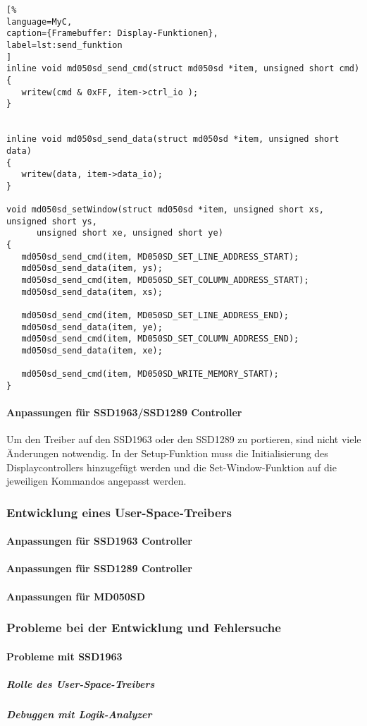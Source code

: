 \begin{lstlisting}[%
language=MyC,
caption={Framebuffer: Display-Funktionen},
label=lst:send_funktion
]
inline void md050sd_send_cmd(struct md050sd *item, unsigned short cmd)
{
   writew(cmd & 0xFF, item->ctrl_io );
}


inline void md050sd_send_data(struct md050sd *item, unsigned short data)
{
   writew(data, item->data_io);
}

void md050sd_setWindow(struct md050sd *item, unsigned short xs, unsigned short ys,
      unsigned short xe, unsigned short ye)
{
   md050sd_send_cmd(item, MD050SD_SET_LINE_ADDRESS_START);
   md050sd_send_data(item, ys);
   md050sd_send_cmd(item, MD050SD_SET_COLUMN_ADDRESS_START);
   md050sd_send_data(item, xs);

   md050sd_send_cmd(item, MD050SD_SET_LINE_ADDRESS_END);
   md050sd_send_data(item, ye);
   md050sd_send_cmd(item, MD050SD_SET_COLUMN_ADDRESS_END);
   md050sd_send_data(item, xe);

   md050sd_send_cmd(item, MD050SD_WRITE_MEMORY_START);
}
\end{lstlisting}
\newpage
\paragraph{Anpassungen für SSD1963/SSD1289 Controller}
Um den Treiber auf den SSD1963 oder den SSD1289 zu portieren, sind nicht viele Änderungen notwendig. In der Setup-Funktion muss die Initialisierung des Displaycontrollers hinzugefügt werden und die Set-Window-Funktion auf die jeweiligen Kommandos angepasst werden.

\subsubsection{Entwicklung eines User-Space-Treibers}
\paragraph{Anpassungen für SSD1963 Controller}
\paragraph{Anpassungen für SSD1289 Controller}
\paragraph{Anpassungen für MD050SD}
\subsubsection{Probleme bei der Entwicklung und Fehlersuche}
\paragraph{Probleme mit SSD1963}
\subparagraph{Rolle des User-Space-Treibers}
\subparagraph{Debuggen mit Logik-Analyzer}




